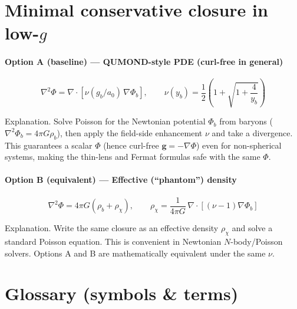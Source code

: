 \documentclass[
]{article}
\begin{document}
\section{\texorpdfstring{Minimal conservative closure in low-\(g\)
}{Minimal conservative closure in low-g }}\label{minimal-conservative-closure-in-low-g}

\paragraph{Option A (baseline) --- QUMOND-style PDE (curl-free in
general)}\label{option-a-baseline-qumond-style-pde-curl-free-in-general}

\[\nabla^{2}\Phi = \nabla \cdot \left\lbrack \nu(g_{b}/a_{0})\,\nabla\Phi_{b} \right\rbrack,\quad\quad\nu(y_{b}) = \frac{1}{2}\left( 1 + \sqrt{1 + \frac{4}{y_{b}}} \right)\]

Explanation. Solve Poisson for the Newtonian potential \(\Phi_{b}\) from
baryons (\(\nabla^{2}\Phi_{b} = 4\pi G\rho_{b}\)), then apply the
field-side enhancement \(\nu\) and take a divergence. This guarantees a
scalar \(\Phi\) (hence curl-free \(\mathbf{g} = - \nabla\Phi\)) even for
non-spherical systems, making the thin-lens and Fermat formulas safe
with the same \(\Phi\).

\paragraph{Option B (equivalent) --- Effective (``phantom'')
density}\label{option-b-equivalent-effective-phantom-density}

\[\nabla^{2}\Phi = 4\pi G(\rho_{b} + \rho_{\chi}),\quad\quad\rho_{\chi} = \frac{1}{4\pi G}\,\nabla \cdot \left\lbrack (\nu - 1)\nabla\Phi_{b} \right\rbrack\]

Explanation. Write the same closure as an effective density
\(\rho_{\chi}\) and solve a standard Poisson equation. This is
convenient in Newtonian \(N\)-body/Poisson solvers. Options A and B are
mathematically equivalent under the same \(\nu\).

\section{Glossary (symbols \& terms)}\label{glossary-symbols-terms}
\end{document}
